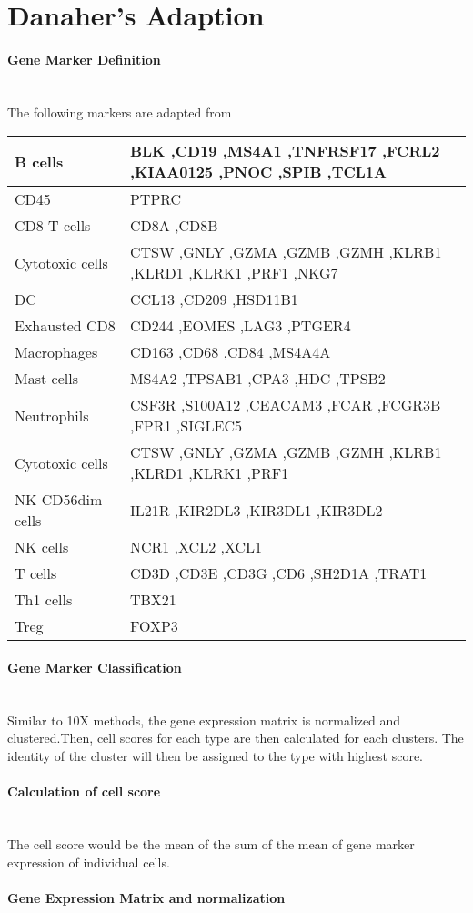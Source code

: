 \documentclass{article}
\begin{document}
\section{Danaher's Adaption}
\paragraph{Gene Marker Definition} ~\\
The following markers are adapted from  
\par
\begin{tabular}{ |l| p{10cm}| }
\hline
B cells&BLK ,CD19 ,MS4A1 ,TNFRSF17 ,FCRL2 ,KIAA0125 ,PNOC ,SPIB ,TCL1A \\ \hline
CD45&PTPRC \\ \hline
CD8 T cells&CD8A ,CD8B \\ \hline
Cytotoxic cells&CTSW ,GNLY ,GZMA ,GZMB ,GZMH ,KLRB1 ,KLRD1 ,KLRK1 ,PRF1 ,NKG7 \\ \hline
DC&CCL13 ,CD209 ,HSD11B1 \\ \hline 
Exhausted CD8&CD244 ,EOMES ,LAG3 ,PTGER4 \\\hline Macrophages&CD163 ,CD68 ,CD84 ,MS4A4A \\ \hline
Mast cells&MS4A2 ,TPSAB1 ,CPA3 ,HDC ,TPSB2 \\ \hline
Neutrophils&CSF3R ,S100A12 ,CEACAM3 ,FCAR ,FCGR3B ,FPR1 ,SIGLEC5 \\\hline
Cytotoxic cells&CTSW ,GNLY ,GZMA ,GZMB ,GZMH ,KLRB1 ,KLRD1 ,KLRK1 ,PRF1 \\\hline 
NK CD56dim cells&IL21R ,KIR2DL3 ,KIR3DL1 ,KIR3DL2 \\\hline
NK cells&NCR1 ,XCL2 ,XCL1 \\ \hline
T cells&CD3D ,CD3E ,CD3G ,CD6 ,SH2D1A ,TRAT1 \\ \hline
Th1 cells&TBX21 \\ \hline
Treg&FOXP3 \\
\hline
\end{tabular}
\paragraph{Gene Marker Classification} ~\\
 Similar to 10X methods, the gene expression matrix is normalized and clustered.Then, cell scores for each type are then calculated for each clusters. The identity of the cluster will then be assigned to the type with highest score. 
\paragraph{Calculation of cell score } ~\\
The cell score would be the mean of the sum of the mean of gene marker expression of individual cells. 
\paragraph{Gene Expression Matrix and normalization} ~\\
\end{document}
